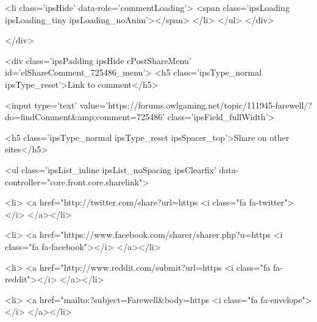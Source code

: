 						
						
					
					<li class='ipsHide' data-role='commentLoading'>
						<span class='ipsLoading ipsLoading_tiny ipsLoading_noAnim'></span>
					</li>
				</ul>
			</div>
		

		
			

		
	</div>

	

	



<div class='ipsPadding ipsHide cPostShareMenu' id='elShareComment_725486_menu'>
	<h5 class='ipsType_normal ipsType_reset'>Link to comment</h5>
	
		
	
	
	<input type='text' value='https://forums.owlgaming.net/topic/111945-farewell/?do=findComment&amp;comment=725486' class='ipsField_fullWidth'>

	
	<h5 class='ipsType_normal ipsType_reset ipsSpacer_top'>Share on other sites</h5>
	

	<ul class='ipsList_inline ipsList_noSpacing ipsClearfix' data-controller="core.front.core.sharelink">
		
			<li>
<a href="http://twitter.com/share?url=https%
	<i class="fa fa-twitter"></i>
</a></li>
		
			<li>
<a href="https://www.facebook.com/sharer/sharer.php?u=https%
	<i class="fa fa-facebook"></i>
</a></li>
		
			<li>
<a href="http://www.reddit.com/submit?url=https%
	<i class="fa fa-reddit"></i>
</a></li>
		
			<li>
<a href="mailto:?subject=Farewell&body=https%
	<i class="fa fa-envelope"></i>
</a></li>
		
